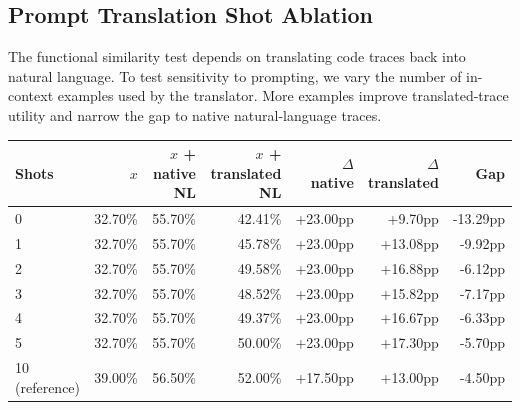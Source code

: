\subsection{Prompt Translation Shot Ablation}
\label{app:prompt_translation_shot_ablation}

The functional similarity test depends on translating code traces back into natural language. To test sensitivity to prompting, we vary the number of in-context examples used by the translator. More examples improve translated-trace utility and narrow the gap to native natural-language traces.

\begin{center}
\small
\begin{tabular*}{\textwidth}{@{\extracolsep{\fill}}lrrrrrr@{}}
\toprule
Shots & $x$ & $x$ + native NL & $x$ + translated NL & $\Delta$ native & $\Delta$ translated & Gap \\
\midrule
0 & 32.70\% & 55.70\% & 42.41\% & +23.00pp & +9.70pp & -13.29pp \\
1 & 32.70\% & 55.70\% & 45.78\% & +23.00pp & +13.08pp & -9.92pp \\
2 & 32.70\% & 55.70\% & 49.58\% & +23.00pp & +16.88pp & -6.12pp \\
3 & 32.70\% & 55.70\% & 48.52\% & +23.00pp & +15.82pp & -7.17pp \\
4 & 32.70\% & 55.70\% & 49.37\% & +23.00pp & +16.67pp & -6.33pp \\
5 & 32.70\% & 55.70\% & 50.00\% & +23.00pp & +17.30pp & -5.70pp \\
10 (reference) & 39.00\% & 56.50\% & 52.00\% & +17.50pp & +13.00pp & -4.50pp \\
\bottomrule
\end{tabular*}
\label{tab:appendix_shot_ablation}
\end{center}

